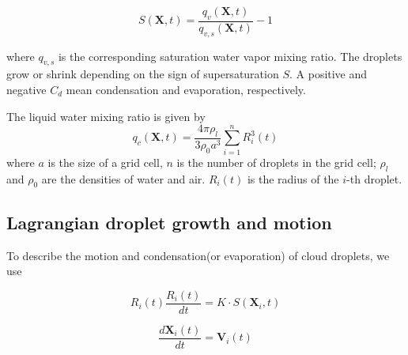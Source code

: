 \documentclass[draft,jgrga]{AGUTeX}
\begin{document}
\begin{article}
\begin{subequations}
\begin{equation}
S(\mathbf{X},t)=\frac{q_{v}(\mathbf{X},t)}{q_{v,s}(\mathbf{X},t)}-1\label{eq:Supersat}
\end{equation}

\end{subequations}

where $q_{v,s}$ is the corresponding saturation water vapor mixing ratio. The droplets 
grow or shrink depending on the sign of supersaturation $S$. A positive and negative 
$C_d$ mean condensation and evaporation, respectively.

The liquid water mixing ratio is given by
\begin{equation}
q_{c}(\mathbf{X},t)=\frac{4\pi\rho_{l}}{3\rho_{0}a^{3}}\sum_{i=1}^{n}R_{i}^{3}(t)\label{eq:cloud_water}
\end{equation}
where $a$ is the size of a grid cell, $n$ is the number of droplets
in the grid cell; $\rho_{l}$ and $\rho_{0}$ are the densities of water and air. $R_{i}(t)$ is the radius of the $i$-th droplet.

\subsection{Lagrangian droplet growth and motion}

To describe the motion and condensation(or evaporation) of cloud droplets, we use

\begin{equation}
R_i(t)\frac{R_i(t)}{dt}=K\cdot S(\mathbf{X}_i,t)\label{eq:Radius}
\end{equation}


\begin{equation}
\frac{d\mathbf{X}_i(t)}{dt}=\mathbf{V}_i(t)\label{eq:Coords}
\end{equation}



\end{article}
\end{document}

